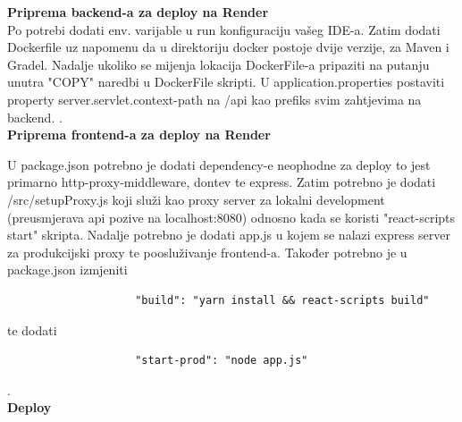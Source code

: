 			
			
			\textbf{Priprema backend-a za deploy na Render}\\
		
			{Po potrebi dodati env. varijable u run konfiguraciju vašeg IDE-a. Zatim dodati Dockerfile uz napomenu da u direktoriju docker postoje dvije verzije, za Maven i Gradel. Nadalje ukoliko se mijenja lokacija DockerFile-a pripaziti na putanju unutra "COPY" naredbi u DockerFile skripti. U application.properties postaviti property server.servlet.context-path na /api kao prefiks svim zahtjevima na backend. }.\\
			
			\noindent\textbf{Priprema frontend-a za deploy na Render}\\
			
			{U package.json potrebno je dodati dependency-e neophodne za deploy to jest primarno http-proxy-middleware, dontev te express. Zatim potrebno je dodati /src/setupProxy.js koji služi kao proxy server za lokalni development (preusmjerava api pozive na localhost:8080) odnosno kada se koristi "react-scripts start" skripta. Nadalje potrebno je dodati app.js u kojem se nalazi express server za produkcijski proxy te poosluživanje frontend-a. Također potrebno je u package.json izmjeniti \begin{verbatim}
					"build": "yarn install && react-scripts build"\end{verbatim}  te dodati \begin{verbatim}
					"start-prod": "node app.js"
				\end{verbatim} }.\\
			
			\noindent\textbf{Deploy}\\
			
